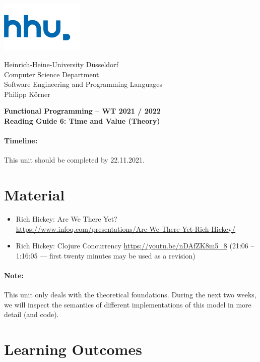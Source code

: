 \documentclass[11pt,a4paper]{article}
\begin{document}
	
\begin{minipage}[b]{\textwidth}
	\parbox[t]{5cm}{%
		\includegraphics[width=4cm]{unilogo}
		\hfill
	}
	\parbox[b]{11cm}{%
		Heinrich-Heine-University D\"usseldorf\\
		Computer Science Department\\
		Software Engineering and Programming Languages\\
		Philipp K\"orner
	}
\end{minipage}
\begin{center}
	\bf
	Functional Programming -- WT 2021 / 2022\\
	Reading Guide 6: Time and Value (Theory)
\end{center}

\pagestyle{empty}

\paragraph{Timeline:} This unit should be completed by 22.11.2021.

\section{Material} 

\begin{itemize}
\item Rich Hickey: Are We There Yet? \\ \url{https://www.infoq.com/presentations/Are-We-There-Yet-Rich-Hickey/}
\item Rich Hickey: Clojure Concurrency \url{https://youtu.be/nDAfZK8m5_8} (21:06 -- 1:16:05 --- first twenty minutes may be used as a revision)
\end{itemize}

\paragraph{Note:} This unit only deals with the theoretical foundations.
During the next two weeks, we will inspect the semantics of different implementations of this model
in more detail (and code).

\section{Learning Outcomes}
\end{document}
